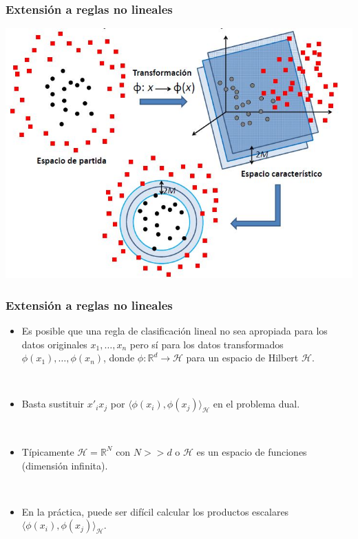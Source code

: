 \documentclass[dvipsnames, pdflatex,slidecentered]{beamer}
\begin{document}
\begin{frame}[plain]
\frametitle{Extensión a reglas no lineales}

\begin{center}
\includegraphics[scale=0.5]{nolineal.jpg}
\end{center}

\end{frame}
\begin{frame}[plain]
\frametitle{Extensión a reglas no lineales}

\begin{itemize}
\item Es posible que una regla de clasificación lineal no sea apropiada para los datos originales $x_1,\ldots,x_n$ pero sí para los datos transformados $\phi(x_1),\ldots,\phi(x_n)$, donde $\phi:\mathbb{R}^d\to \mathcal{H}$ para un espacio de Hilbert $\mathcal{H}$.

\

\item Basta sustituir $x'_ix_j$ por $\langle \phi(x_i),\phi(x_j)\rangle_{\mathcal{H}}$ en el problema dual.

\

\item Típicamente $\mathcal{H}=\mathbb{R}^N$ con $N>>d$ o $\mathcal{H}$ es un espacio de funciones (dimensión infinita).

\

\item En la práctica, puede ser  difícil  calcular los productos escalares  $\langle \phi(x_i),\phi(x_j)\rangle_{\mathcal{H}}$.
\end{itemize}

\end{frame}
\end{document}
